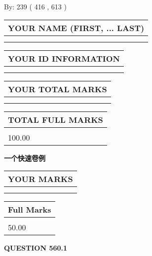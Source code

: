 \documentclass{ctexart}
\begin{document}
   
\hspace{1.0in} By: 
 239 ( 416 ,  613 )
   
   
   
   
\newpage 
\setcounter{page}{ 
   560001 } 
   
   
   
   
\noindent\begin{tabular}{|l|}
\hline
YOUR NAME (FIRST, ... LAST)  \\
\hline
 \\ 
 \\ 
\hline
\end{tabular}
\hspace{0.05in} \begin{tabular}{|l|}
\hline
 YOUR   ID   INFORMATION  \\
\hline
 \\ 
 \\ 
\hline
\end{tabular}
   
   
\vspace{0.2in}\noindent\begin{tabular}{|l|}
\hline
YOUR TOTAL MARKS  \\
\hline
 \\ 
 \\ 
\hline
\end{tabular}
\hspace{0.05in} \begin{tabular}{|l|}
\hline
TOTAL FULL MARKS  \\
\hline
 \\ 
100.00 \\
\hline
\end{tabular}
   
   
 \vspace{0.2in}
{\LARGE {\textbf{ 一个快速卷例}}}
   
   
  
\vspace{0.2in}
  
\noindent\begin{tabular}{|l|}
\hline
 YOUR MARKS  \\
\hline
 \\ 
 \\ 
\hline
\end{tabular}
\hspace{0.05in} \begin{tabular}{|l|}
\hline
 Full Marks  \\
\hline
 \\ 
50.00 \\
\hline
\end{tabular}
{\textbf{\Large{QUESTION
560.1 
}}}
  
\end{document}
